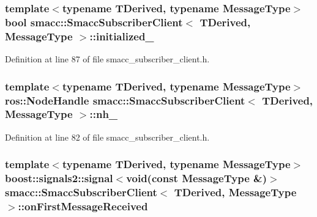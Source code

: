 \subsubsection[{\texorpdfstring{initialized\+\_\+}{initialized_}}]{\setlength{\rightskip}{0pt plus 5cm}template$<$typename T\+Derived, typename Message\+Type$>$ {\bf bool} {\bf smacc\+::\+Smacc\+Subscriber\+Client}$<$ T\+Derived, Message\+Type $>$\+::initialized\+\_\+\hspace{0.3cm}{\ttfamily [private]}}\hypertarget{classsmacc_1_1SmaccSubscriberClient_a38ca48bff3e170c1cfd6acff9da7661c}{}\label{classsmacc_1_1SmaccSubscriberClient_a38ca48bff3e170c1cfd6acff9da7661c}


Definition at line 87 of file smacc\+\_\+subscriber\+\_\+client.\+h.

\subsubsection[{\texorpdfstring{nh\+\_\+}{nh_}}]{\setlength{\rightskip}{0pt plus 5cm}template$<$typename T\+Derived, typename Message\+Type$>$ ros\+::\+Node\+Handle {\bf smacc\+::\+Smacc\+Subscriber\+Client}$<$ T\+Derived, Message\+Type $>$\+::nh\+\_\+\hspace{0.3cm}{\ttfamily [protected]}}\hypertarget{classsmacc_1_1SmaccSubscriberClient_a687bdd388ad68d5831138e7eb70fb9ae}{}\label{classsmacc_1_1SmaccSubscriberClient_a687bdd388ad68d5831138e7eb70fb9ae}


Definition at line 82 of file smacc\+\_\+subscriber\+\_\+client.\+h.

\subsubsection[{\texorpdfstring{on\+First\+Message\+Received}{onFirstMessageReceived}}]{\setlength{\rightskip}{0pt plus 5cm}template$<$typename T\+Derived, typename Message\+Type$>$ boost\+::signals2\+::signal$<$void(const Message\+Type \&)$>$ {\bf smacc\+::\+Smacc\+Subscriber\+Client}$<$ T\+Derived, Message\+Type $>$\+::on\+First\+Message\+Received}\hypertarget{classsmacc_1_1SmaccSubscriberClient_a9c77384c3271293906b47c1e94d55036}{}\label{classsmacc_1_1SmaccSubscriberClient_a9c77384c3271293906b47c1e94d55036}


